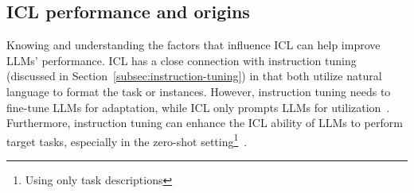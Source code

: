 \subsection{ICL performance and origins}
\label{subsec:icl-performance}

Knowing and understanding the factors that influence ICL can help improve LLMs' performance.
ICL has a close connection with instruction tuning (discussed in Section~\ref{subsec:instruction-tuning}) in that both utilize natural language to format the task or instances.
However, instruction tuning needs to fine-tune LLMs for adaptation, while ICL only prompts LLMs for utilization~\cite{survey}.
Furthermore, instruction tuning can enhance the ICL ability of LLMs to perform target tasks, especially in the zero-shot setting\footnote{Using only task descriptions}~\cite{chung2022scaling}.

